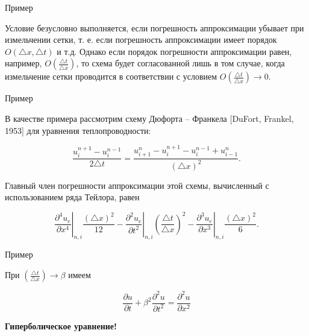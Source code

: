 \documentclass[10pt,xcolor=pst,aspectratio=169]{beamer}
\begin{document}
\begin{frame}{Пример}

    \transdissolve[duration=0.1]
    \justifying
    \large

    Условие безусловно выполняется, если погрешность аппроксимации убывает при измельчении сетки, т. е. если погрешность аппроксимации имеет порядок $\mathit{O} \left( \triangle x, \triangle t \right)$ и т.д. Однако если порядок погрешности аппроксимации равен, например, $\mathit{O} \left( \frac{\triangle t}{\triangle x} \right)$, то схема будет согласованной лишь в том случае, когда измельчение сетки проводится в соответствии с условием $\mathit{O} \left( \frac{\triangle t}{\triangle x} \right) \rightarrow 0$.

\end{frame}

\begin{frame}{Пример}

    \transdissolve[duration=0.1]
    \justifying
    \large

    В качестве примера рассмотрим схему Дюфорта -- Франкела [DuFort, Frankel, 1953] для уравнения теплопроводности:

    \[
        \frac{u^{n + 1}_{i} - u^{n - 1}_{i}}{2 \triangle t} = \frac{u^{n}_{i + 1} - u^{n + 1}_{i} - u^{n - 1}_{i}+ u^{n}_{i - 1}}{\left(\triangle x\right)^{2}}.
    \]

    Главный член погрешности аппроксимации этой схемы, вычисленный с использованием ряда Тейлора, равен

    \[
       \left. \frac{\partial^{4} u_{e}}{\partial x^{4}} \right|_{n, i} \frac{\left( \triangle x \right)^{2}}{12} -  \left. \frac{\partial^{2} u_{e}}{\partial t^{2}} \right|_{n, i} \left( \frac{\triangle t}{\triangle x} \right)^{2} - \left. \frac{\partial^{3} u_{e}}{\partial x^{3}} \right|_{n, i} \frac{\left( \triangle x \right)^{2}}{6}.
    \]

\end{frame}

\begin{frame}{Пример}

    \transdissolve[duration=0.1]
    \justifying
    \large

    При $\left( \frac{\triangle t}{\triangle x} \right) \rightarrow \beta$ имеем

    \[
        \frac{\partial u}{\partial t} + \beta^{2} \frac{\partial^{2} u}{\partial t^{2}} = \frac{\partial^{2} u}{\partial x^{2}}
    \]

    \begin{center}
        \textbf{Гиперболическое уравнение!}
    \end{center}

\end{frame}
\end{document}

